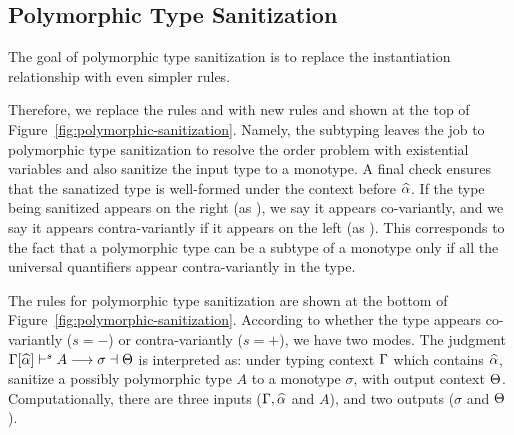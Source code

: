 \subsection{Polymorphic Type Sanitization}

\begin{figure*}[t]

  \caption{New subtyping rules, polymorphic type sanitization.}
  \label{fig:polymorphic-sanitization}
\end{figure*}

The goal of polymorphic type sanitization is to replace the instantiation
relationship with even simpler rules.

Therefore, we replace the rules  and  with new rules
 and  shown at the top of
Figure~\ref{fig:polymorphic-sanitization}. Namely, the subtyping leaves the job
to polymorphic type sanitization to resolve the order problem with existential
variables and also sanitize the input type to a monotype. A final check
ensures that the sanatized type is well-formed under the context before $\widehat{\alpha}$.
If the type being sanitized appears on the right (as ), we say it
appears co-variantly, and we say it appears contra-variantly if it appears on
the left (as ). This corresponds to the fact that a polymorphic type
can be a subtype of a monotype only if all the universal quantifiers appear
contra-variantly in the type.

The rules for polymorphic type sanitization are shown at the bottom of
Figure~\ref{fig:polymorphic-sanitization}. According to whether the type appears
co-variantly ($s = -$) or contra-variantly ($s = +$), we have two modes. The
judgment $\Gamma[\widehat{\alpha}] \vdash^{s} A \longrightarrow \sigma \dashv \Theta$ is interpreted as: under
typing context $\Gamma$ which contains $\widehat{\alpha}$, sanitize a possibly polymorphic
type $A$ to a monotype
$\sigma$, with output context $\Theta$. Computationally, there are three inputs
($\Gamma, \widehat{\alpha}$ and $A$), and two outputs ($\sigma$ and $\Theta$).

